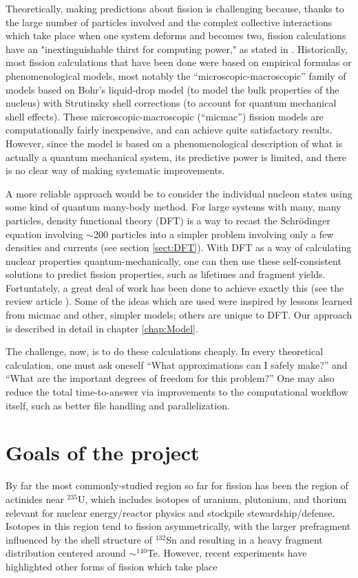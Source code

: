 Theoretically, making predictions about fission is challenging because, thanks to the large number of particles involved and the complex collective interactions which take place when one system deforms and becomes two, fission calculations have an "inextinguishable thirst for computing power," as stated in \cite{Schunck2016}. Historically, most fission calculations that have been done were based on empirical formulas or phenomenological models, most notably the ``microscopic-macroscopic'' family of models based on Bohr's liquid-drop model (to model the bulk properties of the nucleus) with Strutinsky shell corrections (to account for quantum mechanical shell effects). These microscopic-macroscopic (``micmac'') fission models are computationally fairly inexpensive, and can achieve quite satisfactory results. However, since the model is based on a phenomenological description of what is actually a quantum mechanical system, its predictive power is limited, and there is no clear way of making systematic improvements.

A more reliable approach would be to consider the individual nucleon states using some kind of quantum many-body method. For large systems with many, many particles, density functional theory (DFT) is a way to recast the Schr\"{o}dinger equation involving $\sim$200 particles into a simpler problem involving only a few densities and currents (see section \ref{sect:DFT}). With DFT as a way of calculating nuclear properties quantum-mechanically, one can then use these self-consistent solutions to predict fission properties, such as lifetimes and fragment yields. Fortuntately, a great deal of work has been done to achieve exactly this (see the review article \cite{Schunck2016}). Some of the ideas which are used were inspired by lessons learned from micmac and other, simpler models; others are unique to DFT. Our approach is described in detail in chapter \ref{chap:Model}.

The challenge, now, is to do these calculations cheaply. In every theoretical calculation, one must ask oneself ``What approximations can I safely make?'' and ``What are the important degrees of freedom for this problem?'' One may also reduce the total time-to-answer via improvements to the computational workflow itself, such as better file handling and parallelization.

\section{Goals of the project}
By far the most commonly-studied region so far for fission has been the region of actinides near $^{235}$U, which includes isotopes of uranium, plutonium, and thorium relevant for nuclear energy/reactor physics and stockpile stewardship/defense. Isotopes in this region tend to fission asymmetrically, with the larger prefragment influenced by the shell structure of $^{132}$Sn and resulting in a heavy fragment distribution centered around $\sim^{140}$Te. However, recent experiments have highlighted other forms of fission which take place

